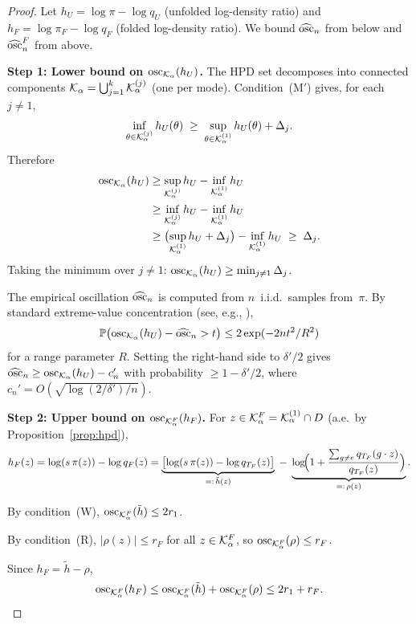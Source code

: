 \begin{proof}
  Let $h_U = \log\pi - \log q_U$ (unfolded log-density ratio)
  and $h_F = \log\pi_F - \log q_F$ (folded log-density ratio).
  We bound $\widehat{\mathrm{osc}}_n$ from below and
  $\widehat{\mathrm{osc}}_n^F$ from above.

  \textbf{Step 1: Lower bound on $\mathrm{osc}_{\mathcal{K}_\alpha}(h_U)$.}
  The HPD set decomposes into connected components
  $\mathcal{K}_\alpha = \bigcup_{j=1}^k \mathcal{K}_\alpha^{(j)}$
  (one per mode).  Condition~(M$'$) gives, for each $j \neq 1$,
  \[
    \inf_{\theta \in \mathcal{K}_\alpha^{(j)}} h_U(\theta)
    \;\geq\;
    \sup_{\theta \in \mathcal{K}_\alpha^{(1)}} h_U(\theta) + \Delta_j.
  \]
  Therefore
  \begin{align*}
    \mathrm{osc}_{\mathcal{K}_\alpha}(h_U)
    &\geq \sup_{\mathcal{K}_\alpha^{(j)}} h_U
           - \inf_{\mathcal{K}_\alpha^{(1)}} h_U \\
    &\geq \inf_{\mathcal{K}_\alpha^{(j)}} h_U
           - \inf_{\mathcal{K}_\alpha^{(1)}} h_U \\
    &\geq \bigl(\sup_{\mathcal{K}_\alpha^{(1)}} h_U + \Delta_j\bigr)
           - \inf_{\mathcal{K}_\alpha^{(1)}} h_U
    \;\geq\; \Delta_j.
  \end{align*}
  Taking the minimum over $j \neq 1$:
  $\mathrm{osc}_{\mathcal{K}_\alpha}(h_U) \geq \min_{j \neq 1} \Delta_j$.

  The empirical oscillation $\widehat{\mathrm{osc}}_n$ is computed from
  $n$~i.i.d.\ samples from~$\pi$.  By standard
  extreme-value concentration (see, e.g.,
  \citealt[Lemma~5.3]{LCNF}),
  \[
    \mathbb{P}\bigl(\mathrm{osc}_{\mathcal{K}_\alpha}(h_U)
    - \widehat{\mathrm{osc}}_n > t\bigr)
    \leq 2\exp(-2nt^2/R^2)
  \]
  for a range parameter $R$.  Setting the right-hand side to
  $\delta'/2$ gives
  $\widehat{\mathrm{osc}}_n \geq \mathrm{osc}_{\mathcal{K}_\alpha}(h_U) - c_n'$
  with probability $\geq 1 - \delta'/2$, where
  $c_n' = O(\sqrt{\log(2/\delta')/n})$.

  \textbf{Step 2: Upper bound on $\mathrm{osc}_{\mathcal{K}_\alpha^F}(h_F)$.}
  For $z \in \mathcal{K}_\alpha^F = \mathcal{K}_\alpha^{(1)} \cap D$ (a.e.\
  by Proposition~\ref{prop:hpd}),
  \[
    h_F(z)
    = \log(s\,\pi(z)) - \log q_F(z)
    = \underbrace{\bigl[\log(s\,\pi(z)) - \log q_{T_F}(z)\bigr]}_{=:\,\tilde{h}(z)}
    \;-\;
    \underbrace{\log\!\Bigl(1 + \frac{\sum_{g \neq e}
    q_{T_F}(g \cdot z)}{q_{T_F}(z)}\Bigr)}_{=:\,\rho(z)}.
  \]

  By condition~(W),
  $\mathrm{osc}_{\mathcal{K}_\alpha^F}(\tilde{h}) \leq 2r_1$.

  By condition~(R),
  $|\rho(z)| \leq r_F$ for all $z \in \mathcal{K}_\alpha^F$,
  so $\mathrm{osc}_{\mathcal{K}_\alpha^F}(\rho) \leq r_F$.

  Since $h_F = \tilde{h} - \rho$,
  \[
    \mathrm{osc}_{\mathcal{K}_\alpha^F}(h_F)
    \leq \mathrm{osc}_{\mathcal{K}_\alpha^F}(\tilde{h})
    + \mathrm{osc}_{\mathcal{K}_\alpha^F}(\rho)
    \leq 2r_1 + r_F.
  \]


\end{proof}
